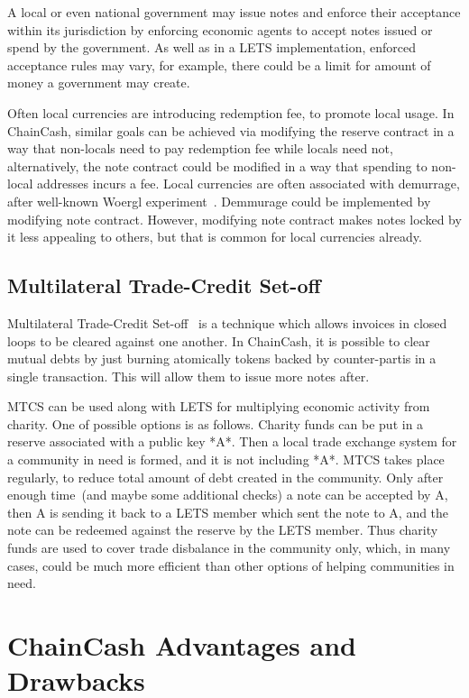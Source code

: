 \documentclass{llncs}   %
\newcommand{\authnote}[2]{\marginpar{\parbox{\marginparwidth}{\tiny %
  \textsf{#1 {\textcolor{blue}{notes: #2}}}}}%
  \textcolor{blue}{\textbf{\dag}}}
\newcommand{\authnote}[2]{
  \textsf{#1 \textcolor{blue}{: #2}}}
\newcommand{\authnote}[2]{}
\newcommand{\knote}[1]{{\authnote{\textcolor{green}{kushti notes}}{#1}}}
\newcommand{\cc}{ChainCash}
\begin{document}
A local or even national government may issue notes and enforce their acceptance within its jurisdiction by enforcing economic agents to accept notes issued or spend by the government. As well as in a LETS implementation, enforced acceptance rules may vary, for example, there
could be a limit for amount of money a government may create.

Often local currencies are introducing redemption fee, to promote local usage. In \cc{}, similar goals can be achieved via modifying the reserve contract in a way that non-locals need to pay redemption fee while locals need not, alternatively, the note contract could be modified in a way that spending to non-local addresses incurs a fee. Local currencies are often associated with demurrage, after well-known Woergl experiment~\cite{unterguggenbercer1934end}. Demmurage could be implemented by modifying note contract. However, modifying note contract makes notes locked by it less appealing to others, but that is common for local currencies already.

\subsection{Multilateral Trade-Credit Set-off}

Multilateral Trade-Credit Set-off~\cite{mtcs} \knote{check/fix ref} is a technique which allows invoices in closed loops to be cleared against one another.
In \cc{}, it is possible to clear mutual debts by just burning atomically tokens backed by counter-partis in a single
transaction. This will allow them to issue more notes after.

MTCS can be used along with LETS for multiplying economic activity from charity. One of possible options is as follows.
Charity funds can be put in a reserve associated with a public key *A*. Then a local trade exchange system for a community
in need is formed, and it is not including *A*. MTCS takes place regularly, to reduce total amount of debt created in the
community. Only after enough time~(and maybe some additional checks) a note can be accepted by A, then A is sending it back to
a LETS member which sent the note to A, and the note can be redeemed against the reserve by the LETS member. Thus
charity funds are used to cover trade disbalance in the community only, which, in many cases, could be much more efficient
than other options of helping communities in need.


\section{\cc{} Advantages and Drawbacks}
\label{sec-adv}
\end{document}

